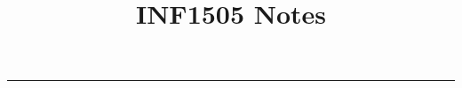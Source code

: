 \documentclass[11pt, a4paper]{book}
\title{INF1505 Notes}
\author{ }
\begin{document}
	\begin{titlepage}
		\maketitle
	\end{titlepage}
	\clearpage\begingroup\pagestyle{empty}\cleardoublepage\endgroup
	\tableofcontents
	\noindent\rule{\textwidth}{0.4pt}
\end{document}
